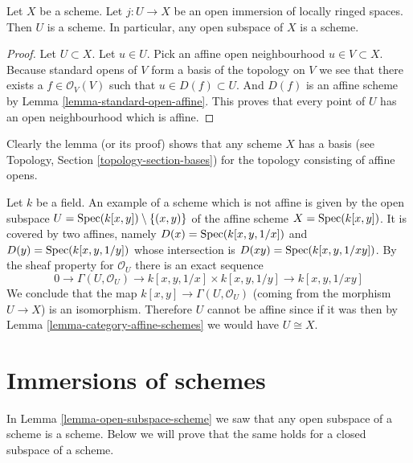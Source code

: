 \begin{lemma}
\label{lemma-open-subspace-scheme}
Let $X$ be a scheme. Let $j : U \to X$ be an open immersion
of locally ringed spaces. Then $U$ is a scheme. In particular,
any open subspace of $X$ is a scheme.
\end{lemma}

\begin{proof}
Let $U \subset X$. Let $u \in U$.
Pick an affine open neighbourhood $u \in V \subset X$.
Because standard opens of $V$ form a basis of the topology
on $V$ we see that there exists a $f\in \mathcal{O}_V(V)$
such that $u \in D(f) \subset U$. And $D(f)$ is an affine scheme
by Lemma \ref{lemma-standard-open-affine}. This proves that every point
of $U$ has an open neighbourhood which is affine.
\end{proof}

\noindent
Clearly the lemma (or its proof) shows that any scheme
$X$ has a basis (see Topology, Section \ref{topology-section-bases})
for the topology consisting of affine opens.

\begin{example}
\label{example-not-affine}
Let $k$ be a field.
An example of a scheme which is not affine is
given by the open subspace
$U = \mathop{\mathrm{Spec}}(k[x, y]) \setminus \{ (x, y)\}$
of the affine scheme $X =\mathop{\mathrm{Spec}}(k[x, y])$.
It is covered by two affines, namely $D(x) = \mathop{\mathrm{Spec}}(k[x, y, 1/x])$
and $D(y) = \mathop{\mathrm{Spec}}(k[x, y, 1/y])$ whose intersection is
$D(xy) = \mathop{\mathrm{Spec}}(k[x, y, 1/xy])$. By the sheaf property
for $\mathcal{O}_U$ there is an exact sequence
$$
0 \to
\Gamma(U, \mathcal{O}_U) \to
k[x, y, 1/x] \times k[x, y, 1/y] \to
k[x, y, 1/xy]
$$
We conclude that the map $k[x, y] \to \Gamma(U, \mathcal{O}_U)$
(coming from the morphism $U \to X$) is an isomorphism.
Therefore $U$ cannot be affine since if it was then by
Lemma \ref{lemma-category-affine-schemes} we would have $U \cong X$.
\end{example}











\section{Immersions of schemes}
\label{section-immersions}

\noindent
In Lemma \ref{lemma-open-subspace-scheme} we saw that any open subspace
of a scheme is a scheme. Below we will prove that the same holds for
a closed subspace of a scheme.

